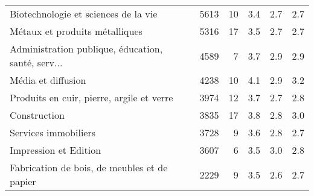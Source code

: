 \begin{tabular}{lrrrrr}
Biotechnologie et sciences de la vie               &          5613 &         10 &      3.4 &       2.7 &      2.7 \\
Métaux et produits métalliques                     &          5316 &         17 &      3.5 &       2.7 &      2.7 \\
Administration publique, éducation, santé, serv... &          4589 &          7 &      3.7 &       2.9 &      2.9 \\
Média et diffusion                                 &          4238 &         10 &      4.1 &       2.9 &      3.2 \\
Produits en cuir, pierre, argile et verre          &          3974 &         12 &      3.7 &       2.7 &      2.8 \\
Construction                                       &          3835 &         17 &      3.8 &       2.8 &      3.0 \\
Services immobiliers                               &          3728 &          9 &      3.6 &       2.8 &      2.7 \\
Impression et Edition                              &          3607 &          6 &      3.5 &       3.0 &      2.8 \\
Fabrication de bois, de meubles et de papier       &          2229 &          9 &      3.5 &       2.6 &      2.7 \\
\bottomrule
\end{tabular}
